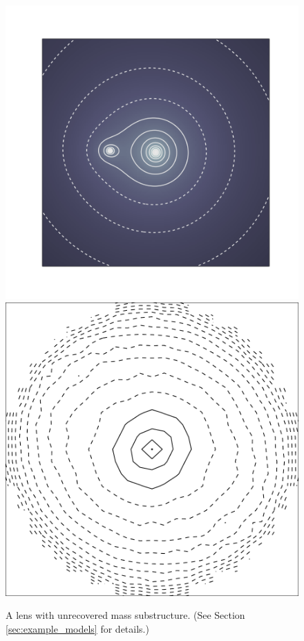 \begin{figure}
  \includegraphics[width=\myplotswidth]{fig/ASW000195x_006975_kappa.png}
  \includegraphics[width=\myplotswidth]{fig/006975_mass}
  \caption[result 6975 (ASW000195x)]{A lens with unrecovered mass
    substructure. (See Section \ref{sec:example_models} for details.)}
  \label{fig:6975}
\end{figure}
  
